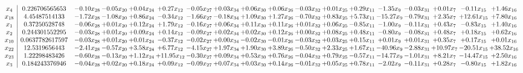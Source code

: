 \documentclass[9pt]{article}
\begin{document}
 \[\begin{array}{c| c c@{\hskip 2pt} c@{\hskip 2pt} c@{\hskip 2pt} c@{\hskip 2pt} c@{\hskip 2pt} c@{\hskip 2pt} c@{\hskip 2pt} c@{\hskip 2pt} c@{\hskip 2pt} c@{\hskip 2pt} c@{\hskip 2pt} c@{\hskip 2pt} c@{\hskip 2pt} c@{\hskip 2pt} c@{\hskip 2pt} c@{\hskip 2pt} }
 x_{4}   &  0.226706565653 & -0.10 x_{28} & -0.05 x_{20} & +  0.04 x_{24} & +  0.27 x_{12} & -0.05 x_{27} & +  0.03 x_{34} & +  0.06 x_{30} & +  0.06 x_{26} & -0.03 x_{32} & +  0.01 x_{25} & +  0.29 x_{11} & -1.35 x_{9} & -0.03 x_{31} & +  0.01 x_{7} & -0.11 x_{15} & +  1.46 x_{16}\\
 x_{18}   &  4.45487514133 & -1.72 x_{28} & -1.08 x_{20} & +  0.86 x_{24} & -0.34 x_{12} & -1.66 x_{27} & -0.18 x_{34} & +  1.09 x_{30} & +  1.27 x_{26} & -0.70 x_{32} & +  0.83 x_{25} & +  5.73 x_{11} & -15.27 x_{9} & -0.79 x_{31} & +  2.35 x_{7} & + 12.61 x_{15} & +  7.80 x_{16}\\
 x_{1}   &  0.37250528748 & -0.06 x_{28} & +  0.01 x_{20} & +  0.12 x_{24} & +  1.79 x_{12} & -0.16 x_{27} & +  0.06 x_{34} & +  0.11 x_{30} & +  0.11 x_{26} & +  0.01 x_{32} & +  0.06 x_{25} & -0.85 x_{11} & -1.00 x_{9} & -0.11 x_{31} & +  0.43 x_{7} & -0.83 x_{15} & +  1.40 x_{16}\\
 x_{2}   &  0.244301552295 & -0.03 x_{28} & +  0.01 x_{20} & +  0.09 x_{24} & +  0.14 x_{12} & -0.09 x_{27} & +  0.02 x_{34} & +  0.02 x_{30} & +  0.12 x_{26} & +  0.00 x_{32} & +  0.08 x_{25} & +  0.48 x_{11} & -0.80 x_{9} & -0.08 x_{31} & +  0.48 x_{7} & +  0.18 x_{15} & +  0.62 x_{16}\\
 x_{10}   &  0.0637782617597 & -0.03 x_{28} & +  0.01 x_{20} & +  0.01 x_{24} & -0.37 x_{12} & -0.02 x_{27} & +  0.00 x_{34} & -0.02 x_{30} & -0.01 x_{26} & -0.03 x_{32} & +  0.03 x_{25} & +  0.15 x_{11} & +  0.01 x_{9} & +  0.01 x_{31} & +  0.35 x_{7} & +  0.17 x_{15} & +  0.01 x_{16}\\
 x_{22}   &  12.5319656443 & -2.41 x_{28} & -0.57 x_{20} & +  3.58 x_{24} & +  6.77 x_{12} & -4.15 x_{27} & +  1.97 x_{34} & +  1.90 x_{30} & +  3.89 x_{26} & -0.50 x_{32} & +  2.33 x_{25} & +  1.67 x_{11} & -40.96 x_{9} & -2.88 x_{31} & + 10.97 x_{7} & -20.51 x_{15} & + 38.52 x_{16}\\
 x_{23}   &  1.22298483426 & -0.60 x_{28} & -0.13 x_{20} & +  1.12 x_{24} & + 11.95 x_{12} & -0.30 x_{27} & +  0.09 x_{34} & +  0.53 x_{30} & +  0.76 x_{26} & -0.04 x_{32} & +  0.79 x_{25} & -0.57 x_{11} & -14.77 x_{9} & -1.01 x_{31} & +  8.21 x_{7} & -14.47 x_{15} & +  2.50 x_{16}\\
 x_{3}   &  0.184243376946 & -0.04 x_{28} & +  0.02 x_{20} & +  0.18 x_{24} & +  0.09 x_{12} & -0.09 x_{27} & +  0.07 x_{34} & +  0.03 x_{30} & +  0.14 x_{26} & -0.01 x_{32} & +  0.05 x_{25} & +  0.78 x_{11} & -2.02 x_{9} & -0.11 x_{31} & +  0.28 x_{7} & -0.80 x_{15} & +  1.82 x_{16}\\

\end{array}\]
\end{document}
